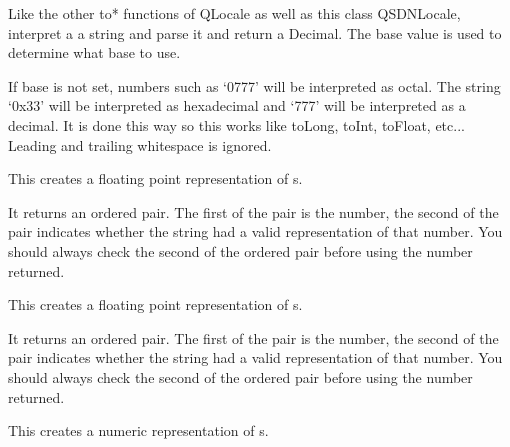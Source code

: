\documentclass[letterpaper,10pt,english]{sphinxmanual}
\begin{document}
\begin{fulllineitems}
\begin{fulllineitems}
\begin{quote}
\begin{description}
\end{description}\end{quote}

Like the other to* functions of QLocale as well as this class QSDNLocale, interpret a 
a string and parse it and return a Decimal.  The base value is used to determine what base to use.

If base is not set, numbers such as `0777' will be interpreted as octal.  The string `0x33' will
be interpreted as hexadecimal and `777' will be interpreted as a decimal.  It is done this way
so this works like toLong, toInt, toFloat, etc...
Leading and trailing whitespace is ignored.

\end{fulllineitems}


\begin{fulllineitems}
\label{index:qsdn.QSDNLocale.toDouble}
This creates a floating point representation of s.

It returns an ordered pair.  The first of the pair is the number, the second of the pair indicates whether the string had a valid representation of that number.  You should always check the second of the ordered pair before using the number returned.

\end{fulllineitems}


\begin{fulllineitems}
\label{index:qsdn.QSDNLocale.toFloat}
This creates a floating point representation of s.

It returns an ordered pair.  The first of the pair is the number, the second of the pair indicates whether the string had a valid representation of that number.  You should always check the second of the ordered pair before using the number returned.

\end{fulllineitems}


\begin{fulllineitems}
\label{index:qsdn.QSDNLocale.toLongLong}
This creates a numeric representation of s.


\end{fulllineitems}
\end{fulllineitems}
\end{document}
